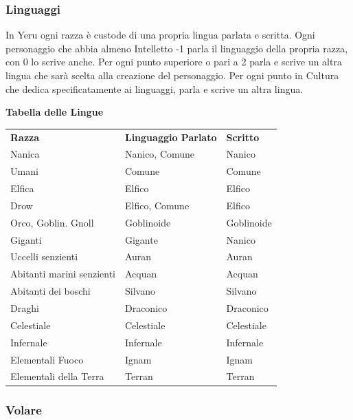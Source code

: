 \documentclass[a4paper,11pt,twoside,openany]{book}
\begin{document}
\bigskip

\subsubsection{Linguaggi}

\label{linguaggi}

In Yeru ogni razza è custode di una propria lingua parlata e scritta. Ogni personaggio che abbia almeno Intelletto -1 parla il linguaggio della propria razza, con 0 lo scrive anche.
Per ogni punto superiore o pari a 2 parla e scrive un altra lingua che sarà scelta alla creazione del personaggio.
Per ogni punto in Cultura che dedica specificatamente ai linguaggi, parla e scrive un altra lingua.

\bigskip

\textbf{Tabella delle Lingue}

\medskip

\begin{tabular}{lll}
	\toprule
	\textbf{Razza}            & \textbf{Linguaggio Parlato} & \textbf{Scritto}\tabularnewline
	Nanica                    & Nanico, Comune              & Nanico\tabularnewline
	Umani                     & Comune                      & Comune\tabularnewline
	Elfica                    & Elfico                      & Elfico\tabularnewline
	Drow                      & Elfico, Comune              & Elfico\tabularnewline
	Orco, Goblin. Gnoll       & Goblinoide                  & Goblinoide\tabularnewline
	Giganti                   & Gigante                     & Nanico\tabularnewline
	Uccelli senzienti         & Auran                       & Auran\tabularnewline
	Abitanti marini senzienti & Acquan                      & Acquan\tabularnewline
	Abitanti dei boschi       & Silvano                     & Silvano\tabularnewline
	Draghi                    & Draconico                   & Draconico\tabularnewline
	Celestiale                & Celestiale                  & Celestiale\tabularnewline
	Infernale                 & Infernale                   & Infernale\tabularnewline
	Elementali Fuoco          & Ignam                       & Ignam\tabularnewline
	Elementali della Terra    & Terran                      & Terran\tabularnewline
\end{tabular}

\subsubsection{Volare}

\label{volare}
\end{document}
